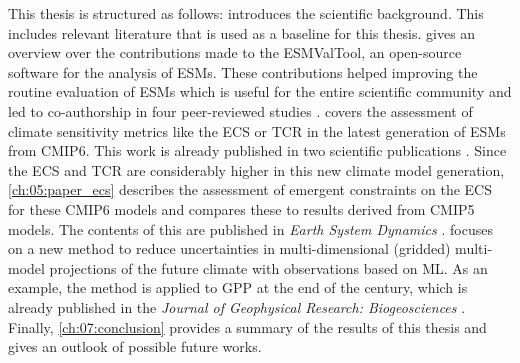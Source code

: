 This thesis is structured as follows: 
introduces the scientific background. This includes relevant literature that is
used as a baseline for this thesis.  gives an overview
over the contributions made to the \ac{ESMValTool}, an open-source software for
the analysis of \acp{ESM}. These contributions helped improving the routine
evaluation of \acp{ESM} which is useful for the entire scientific community and
led to co-authorship in four peer-reviewed studies \autocite{Eyring2020,
  Lauer2020, Righi2020, Weigel2020}. 
covers the assessment of climate sensitivity metrics like the \ac{ECS} or
\ac{TCR} in the latest generation of \acp{ESM} from \acs{CMIP}6. This work is
already published in two scientific publications \autocite{Bock2020,
  Meehl2020}. Since the \ac{ECS} and \ac{TCR} are considerably higher in this
new climate model generation, \cref{ch:05:paper_ecs} describes the assessment
of emergent constraints on the \ac{ECS} for these \acs{CMIP}6 models and
compares these to results derived from \acs{CMIP}5 models. The contents of this
 are published in \emph{Earth System Dynamics}
\autocite{Schlund2020a}.  focuses on a new method to
reduce uncertainties in multi-dimensional (gridded) multi-model projections of
the future climate with observations based on \ac{ML}. As an example, the
method is applied to \ac{GPP} at the end of the  century, which is
already published in the \emph{Journal of Geophysical Research: Biogeosciences}
\autocite{Schlund2020}. Finally, \cref{ch:07:conclusion} provides a summary of
the results of this thesis and gives an outlook of possible future works.

